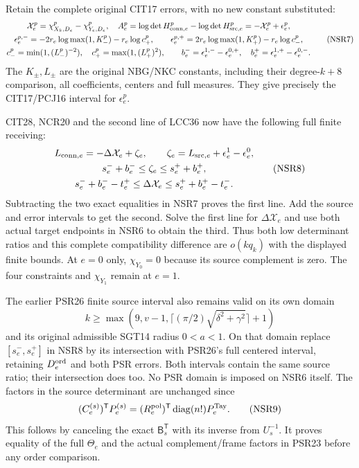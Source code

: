 \documentclass[11pt,a4paper]{article}
\begin{document}
Retain the complete original CIT17 errors, with no new
constant substituted:
\[
 \begin{gathered}
 \mathcal X_e^p=\chi_{X_k,D_e}^p-\chi_{Y_e,D_e}^p,\quad
 A_e^p=\log\det H_{{\rm conn},e}^p-\log\det H_{{\rm src},e}^p
        =-\mathcal X_e^p+\epsilon_e^p,\\
 \epsilon_e^{p,-}
  =-2r_e\log\max(1,K_-^p)-r_e\log c_+^p,\qquad
 \epsilon_e^{p,+}
  =2r_e\log\max(1,K_+^p)-r_e\log c_-^p,\\
 c_-^p=\min(1,(L_-^p)^{-2}),\quad
 c_+^p=\max(1,(L_+^p)^2),\qquad
 b_e^-=\epsilon_e^{1,-}-\epsilon_e^{0,+},\quad
 b_e^+=\epsilon_e^{1,+}-\epsilon_e^{0,-}.
 \end{gathered}\tag{NSR7}
\]
The $K_\pm,L_\pm$ are the original NBG/NKC constants,
including their degree-$k+8$ comparison, all coefficients,
centers and full measures. They give precisely the
CIT17/PCJ16 interval for $\epsilon_e^p$.

CIT28, NCR20 and the second line of LCC36 now have the
following full finite receiving:
\[
 \begin{gathered}
 L_{{\rm conn},e}=-\Delta\mathcal X_e+\zeta_e,\qquad
 \zeta_e=L_{{\rm src},e}+\epsilon_e^1-\epsilon_e^0,\\
 s_e^-+b_e^-\le\zeta_e\le s_e^++b_e^+,\\
 s_e^-+b_e^- -t_e^+
      \le\Delta\mathcal X_e
      \le s_e^++b_e^+ -t_e^- .
 \end{gathered}\tag{NSR8}
\]
Subtracting the two exact equalities in NSR7 proves the
first line. Add the source and error intervals to get
the second. Solve the first line for $\Delta\mathcal X_e$
and use both actual target endpoints in NSR6 to obtain
the third. Thus both low determinant ratios and this
complete compatibility difference are $o(kq_k)$ with
the displayed finite bounds. At $e=0$ only,
$\chi_{Y_0}=0$ because its source complement is zero.
The four constraints and $\chi_{Y_1}$ remain at $e=1$.

The earlier PSR26 finite source interval also remains
valid on its own domain
\[
 k\ge\max(9,v-1,\lceil(\pi/2)\sqrt{\delta^2+\gamma^2}\rceil+1)
\]
and its original admissible SGT14 radius $0<a<1$.
On that domain replace $[s_e^-,s_e^+]$ in NSR8 by its
intersection with PSR26's full centered interval, retaining
$D_e^{\rm ord}$ and both PSR errors. Both intervals contain
the same source ratio; their intersection does too.
No PSR domain is imposed on NSR6 itself.
The factors in the source determinant are unchanged since
\[
 (C_e^{(s)})^{\mathsf T}P_e^{(s)}
   =(R_e^{\rm pol})^{\mathsf T}\operatorname{diag}(n!)P_e^{\rm Tay}.
 \tag{NSR9}
\]
This follows by canceling the exact $\mathsf B_s^{\mathsf T}$
with its inverse from $U_s^{-1}$. It proves equality of
the full $\Theta_e$ and the actual complement/frame factors
in PSR23 before any order comparison.
\end{document}
